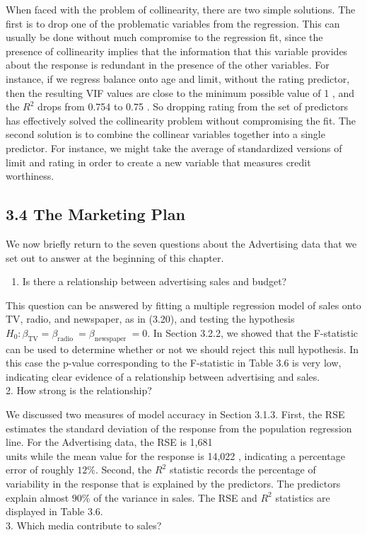 \documentclass[10pt]{article}
\begin{document}
When faced with the problem of collinearity, there are two simple solutions. The first is to drop one of the problematic variables from the regression. This can usually be done without much compromise to the regression fit, since the presence of collinearity implies that the information that this variable provides about the response is redundant in the presence of the other variables. For instance, if we regress balance onto age and limit, without the rating predictor, then the resulting VIF values are close to the minimum possible value of 1 , and the $R^{2}$ drops from 0.754 to 0.75 . So dropping rating from the set of predictors has effectively solved the collinearity problem without compromising the fit. The second solution is to combine the collinear variables together into a single predictor. For instance, we might take the average of standardized versions of limit and rating in order to create a new variable that measures credit worthiness.

\subsection*{3.4 The Marketing Plan}
We now briefly return to the seven questions about the Advertising data that we set out to answer at the beginning of this chapter.

\begin{enumerate}
  \item Is there a relationship between advertising sales and budget?
\end{enumerate}

This question can be answered by fitting a multiple regression model of sales onto TV, radio, and newspaper, as in (3.20), and testing the hypothesis $H_{0}: \beta_{\mathrm{TV}}=\beta_{\text {radio }}=\beta_{\text {newspaper }}=0$. In Section 3.2.2, we showed that the F-statistic can be used to determine whether or not we should reject this null hypothesis. In this case the p-value corresponding to the F-statistic in Table 3.6 is very low, indicating clear evidence of a relationship between advertising and sales.\\
2. How strong is the relationship?

We discussed two measures of model accuracy in Section 3.1.3. First, the RSE estimates the standard deviation of the response from the population regression line. For the Advertising data, the RSE is 1,681\\
units while the mean value for the response is 14,022 , indicating a percentage error of roughly $12 \%$. Second, the $R^{2}$ statistic records the percentage of variability in the response that is explained by the predictors. The predictors explain almost $90 \%$ of the variance in sales. The RSE and $R^{2}$ statistics are displayed in Table 3.6.\\
3. Which media contribute to sales?
\end{document}
